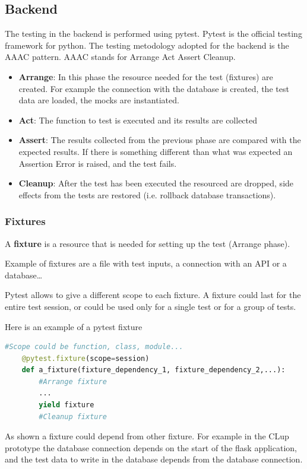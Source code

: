 \subsection{Backend}
The testing in the backend is performed using pytest.
Pytest is the official testing framework for python.
The testing metodology adopted for the backend is the AAAC pattern.
AAAC stands for Arrange Act Assert Cleanup.
\begin{itemize}
    \item \textbf{Arrange}: In this phase the resource needed for the test (fixtures) are created. For example the connection with the database is created, the test data are loaded, the mocks are instantiated.
    \item \textbf{Act}: The function to test is executed and its results are collected
    \item \textbf{Assert}: The results collected from the previous phase are compared with the expected results. If there is something different than what was expected an Assertion Error is raised, and the test fails.
    \item \textbf{Cleanup}: After the test has been executed the resourced are dropped, side effects from the tests are restored (i.e. rollback database transactions).
\end{itemize}

\subsubsection{Fixtures}
A \textbf{fixture} is a resource that is needed for setting up the test (Arrange phase).

Example of fixtures are a file with test inputs, a connection with an API or a database\ldots

Pytest allows to give a different scope to each fixture. A fixture could last for the entire test session, or could be used only for a single test or for a group of tests.

Here is an example of a pytest fixture
\begin{lstlisting}[language=python]
    #Scope could be function, class, module...
    @pytest.fixture(scope=session)
    def a_fixture(fixture_dependency_1, fixture_dependency_2,...):
        #Arrange fixture
        ... 
        yield fixture 
        #Cleanup fixture
\end{lstlisting}
As shown a fixture could depend from other fixture. For example in the CLup prototype the database connection depends on the start of the flask application, and the test data to write in the database depends from the database connection.


